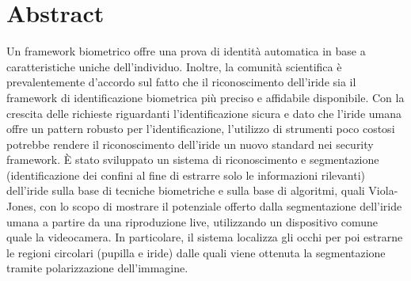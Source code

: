 \begin{comment}
Comandi per eliminare i numeri dall'abstract:

\pagestyle{empty}
\let\originalsecdef\secdef
\def\secdef{\thispagestyle{empty}\originalsecdef}
\thispagestyle{empty}

\end{comment}

\pagestyle{plain}
 
\chapter{Abstract}
Un framework biometrico offre una prova di identità automatica in base a caratteristiche uniche dell'individuo. Inoltre, la comunità scientifica è prevalentemente d'accordo sul fatto che il riconoscimento dell'iride sia il framework di identificazione biometrica più preciso e affidabile disponibile.
Con la crescita delle richieste riguardanti l'identificazione sicura e dato che l'iride umana offre un pattern robusto per l'identificazione, l'utilizzo di strumenti poco costosi potrebbe rendere il riconoscimento dell'iride un nuovo standard nei security framework. È stato sviluppato un sistema di riconoscimento e segmentazione (identificazione dei confini al fine di estrarre solo le informazioni rilevanti) dell'iride sulla base di tecniche biometriche e sulla base di algoritmi, quali Viola-Jones, con lo scopo di mostrare il potenziale offerto dalla segmentazione dell'iride umana a partire da una riproduzione live, utilizzando un dispositivo comune quale la videocamera.
In particolare, il sistema localizza gli occhi per poi estrarne le regioni circolari (pupilla e iride) dalle quali viene ottenuta la segmentazione tramite polarizzazione dell'immagine.